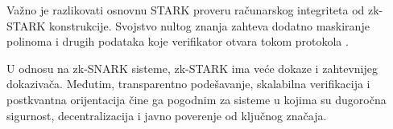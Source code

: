 Važno je razlikovati osnovnu STARK proveru računarskog integriteta od
zk-STARK konstrukcije. Svojstvo nultog znanja zahteva dodatno maskiranje
polinoma i drugih podataka koje verifikator otvara tokom protokola
\cite{stark2018,ethstark2023}.

U odnosu na zk-SNARK sisteme, zk-STARK ima veće dokaze i zahtevnijeg
dokazivača. Međutim, transparentno podešavanje, skalabilna verifikacija i
postkvantna orijentacija čine ga pogodnim za sisteme u kojima su dugoročna
sigurnost, decentralizacija i javno poverenje od ključnog značaja.
